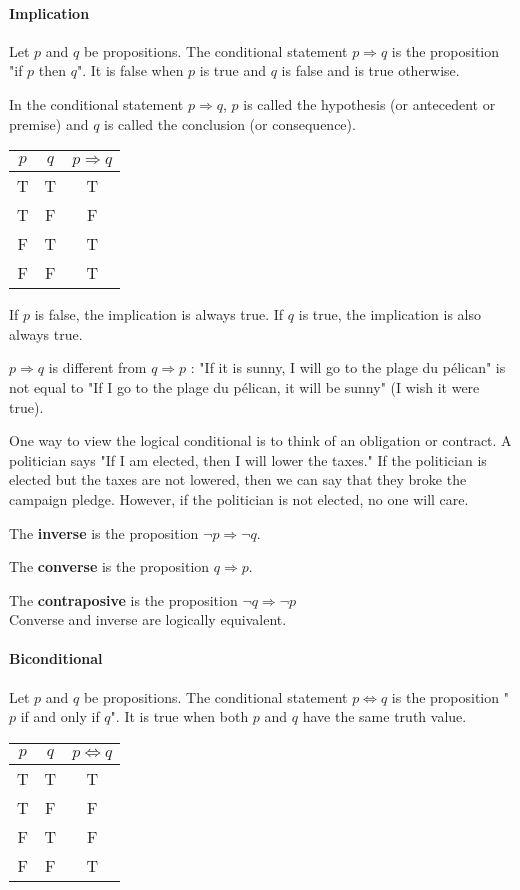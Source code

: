 \documentclass[10pt,a4paper]{book}
\begin{document}
\paragraph*{Implication}
Let $p$ and $q$ be propositions. The conditional statement $p \Rightarrow q$ is the proposition "if $p$ then $q$". It is false when $p$ is true and $q$ is false and is true otherwise.\par 
In the conditional statement $p \Rightarrow q$, $p$ is called the hypothesis (or antecedent or premise) and $q$ is called the conclusion (or consequence).\\
\begin{tabular}{ |c  c | c| }
\hline
 $p$ & $q$ & $p\Rightarrow q$\\
 \hline
 T & T & T \\ 
 T & F & F \\  
 F & T & T \\
 F & F & T \\
 \hline
\end{tabular}\par
If $p$ is false, the implication is always true. If $q$ is true, the implication is also always true.\par 
$p\Rightarrow q$ is different from $q\Rightarrow p$ : "If it is sunny, I will go to the plage du pélican" is not equal to "If I go to the plage du pélican, it will be sunny" (I wish it were true).\par 
One way to view the logical conditional is to think of an obligation or contract. A politician says "If I am elected, then I will lower the taxes." If the politician is elected but the taxes are not lowered, then we can say that they broke the campaign pledge. However, if the politician is not elected, no one will care.\par 
The \textbf{inverse} is the proposition $\neg p\Rightarrow\neg q$.\par
The \textbf{converse} is the proposition $q\Rightarrow p$.\par
The \textbf{contraposive} is the proposition $\neg q\Rightarrow\neg p$\\
Converse and inverse are logically equivalent.
\paragraph*{Biconditional}
Let $p$ and $q$ be propositions. The conditional statement $p \Leftrightarrow q$ is the proposition "$p$ if and only if $q$". It is true when both $p$ and $q$ have the same truth value.\\
\begin{tabular}{ |c  c | c| }
\hline
 $p$ & $q$ & $p\Leftrightarrow q$\\
 \hline
 T & T & T \\ 
 T & F & F \\  
 F & T & F \\
 F & F & T \\
 \hline
\end{tabular}\par
\end{document}
